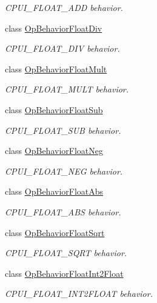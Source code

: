 \begin{DoxyCompactItemize}
\begin{DoxyCompactList}\small\item\em C\+P\+U\+I\+\_\+\+F\+L\+O\+A\+T\+\_\+\+A\+DD behavior. \end{DoxyCompactList}\item 
class \mbox{\hyperlink{class_op_behavior_float_div}{Op\+Behavior\+Float\+Div}}
\begin{DoxyCompactList}\small\item\em C\+P\+U\+I\+\_\+\+F\+L\+O\+A\+T\+\_\+\+D\+IV behavior. \end{DoxyCompactList}\item 
class \mbox{\hyperlink{class_op_behavior_float_mult}{Op\+Behavior\+Float\+Mult}}
\begin{DoxyCompactList}\small\item\em C\+P\+U\+I\+\_\+\+F\+L\+O\+A\+T\+\_\+\+M\+U\+LT behavior. \end{DoxyCompactList}\item 
class \mbox{\hyperlink{class_op_behavior_float_sub}{Op\+Behavior\+Float\+Sub}}
\begin{DoxyCompactList}\small\item\em C\+P\+U\+I\+\_\+\+F\+L\+O\+A\+T\+\_\+\+S\+UB behavior. \end{DoxyCompactList}\item 
class \mbox{\hyperlink{class_op_behavior_float_neg}{Op\+Behavior\+Float\+Neg}}
\begin{DoxyCompactList}\small\item\em C\+P\+U\+I\+\_\+\+F\+L\+O\+A\+T\+\_\+\+N\+EG behavior. \end{DoxyCompactList}\item 
class \mbox{\hyperlink{class_op_behavior_float_abs}{Op\+Behavior\+Float\+Abs}}
\begin{DoxyCompactList}\small\item\em C\+P\+U\+I\+\_\+\+F\+L\+O\+A\+T\+\_\+\+A\+BS behavior. \end{DoxyCompactList}\item 
class \mbox{\hyperlink{class_op_behavior_float_sqrt}{Op\+Behavior\+Float\+Sqrt}}
\begin{DoxyCompactList}\small\item\em C\+P\+U\+I\+\_\+\+F\+L\+O\+A\+T\+\_\+\+S\+Q\+RT behavior. \end{DoxyCompactList}\item 
class \mbox{\hyperlink{class_op_behavior_float_int2_float}{Op\+Behavior\+Float\+Int2\+Float}}
\begin{DoxyCompactList}\small\item\em C\+P\+U\+I\+\_\+\+F\+L\+O\+A\+T\+\_\+\+I\+N\+T2\+F\+L\+O\+AT behavior. \end{DoxyCompactList}\item 

\end{DoxyCompactItemize}
